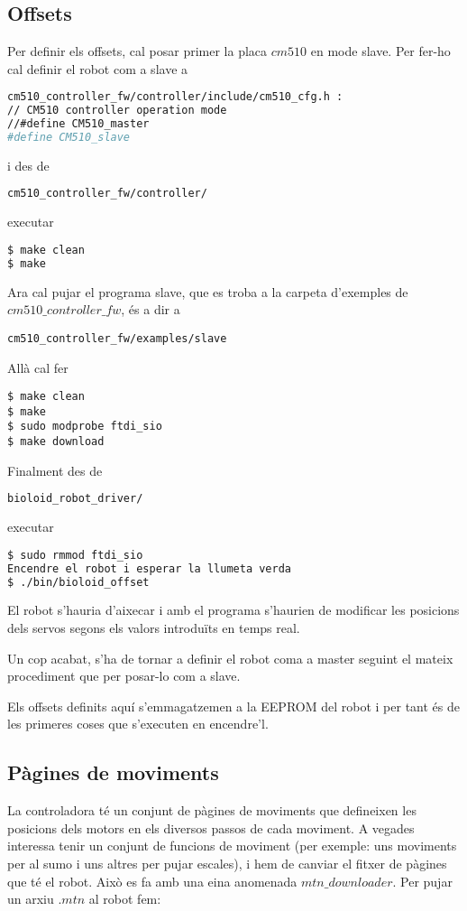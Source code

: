 \documentclass{article}
\begin{document}
\subsection{Offsets}
Per definir els offsets, cal posar primer la placa $cm510$ en mode slave. Per fer-ho cal definir el robot com a slave a 
\begin{lstlisting}[language=bash]
cm510_controller_fw/controller/include/cm510_cfg.h :
// CM510 controller operation mode
//#define CM510_master
#define CM510_slave
\end{lstlisting}
i des de 
\begin{lstlisting}[language=bash]
cm510_controller_fw/controller/
\end{lstlisting}
executar
\begin{lstlisting}[language=bash]
$ make clean
$ make
\end{lstlisting}
Ara cal pujar el programa slave, que es troba a la carpeta d'exemples de $cm510\_controller\_fw$, és a dir a
\begin{lstlisting}
cm510_controller_fw/examples/slave
\end{lstlisting}
Allà cal fer
\begin{lstlisting}
$ make clean
$ make
$ sudo modprobe ftdi_sio
$ make download
\end{lstlisting}

Finalment des de 
\begin{lstlisting}[language=bash]
bioloid_robot_driver/
\end{lstlisting}
executar
\begin{lstlisting}[language=bash]
$ sudo rmmod ftdi_sio
Encendre el robot i esperar la llumeta verda
$ ./bin/bioloid_offset
\end{lstlisting}
El robot s'hauria d'aixecar i amb el programa s'haurien de modificar les posicions dels servos segons els valors introduïts en temps real.

Un cop acabat, s'ha de tornar a definir el robot coma a master seguint el mateix procediment que per posar-lo com a slave.

Els offsets definits aquí s'emmagatzemen a la EEPROM del robot i per tant és de les primeres coses que s'executen en encendre'l. 

\subsection{Pàgines de moviments}
La controladora té un conjunt de pàgines de moviments que defineixen les posicions dels motors en els diversos passos de cada moviment. A vegades interessa tenir un conjunt de funcions de moviment (per exemple: uns moviments per al sumo i uns altres per pujar escales), i hem de canviar el fitxer de pàgines que té el robot. Això es fa amb una eina anomenada $mtn\_downloader$.
Per pujar un arxiu $.mtn$ al robot fem:
\end{document}
